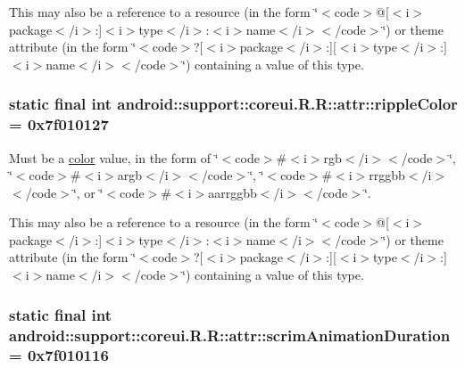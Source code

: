This may also be a reference to a resource (in the form \char`\"{}$<$code$>$@\mbox{[}$<$i$>$package$<$/i$>$:\mbox{]}$<$i$>$type$<$/i$>$:$<$i$>$name$<$/i$>$$<$/code$>$\char`\"{}) or theme attribute (in the form \char`\"{}$<$code$>$?\mbox{[}$<$i$>$package$<$/i$>$:\mbox{]}\mbox{[}$<$i$>$type$<$/i$>$:\mbox{]}$<$i$>$name$<$/i$>$$<$/code$>$\char`\"{}) containing a value of this type. \hypertarget{classandroid_1_1support_1_1coreui_1_1_r_1_1attr_b1eae2b1ba0e2289f70cf01928a468b0}{
\subsubsection[{rippleColor}]{\setlength{\rightskip}{0pt plus 5cm}static final int android::support::coreui.R.R::attr::rippleColor = 0x7f010127}}
\label{classandroid_1_1support_1_1coreui_1_1_r_1_1attr_b1eae2b1ba0e2289f70cf01928a468b0}


Must be a \hyperlink{classandroid_1_1support_1_1coreui_1_1_r_1_1color}{color} value, in the form of \char`\"{}$<$code$>$\#$<$i$>$rgb$<$/i$>$$<$/code$>$\char`\"{}, \char`\"{}$<$code$>$\#$<$i$>$argb$<$/i$>$$<$/code$>$\char`\"{}, \char`\"{}$<$code$>$\#$<$i$>$rrggbb$<$/i$>$$<$/code$>$\char`\"{}, or \char`\"{}$<$code$>$\#$<$i$>$aarrggbb$<$/i$>$$<$/code$>$\char`\"{}. 

This may also be a reference to a resource (in the form \char`\"{}$<$code$>$@\mbox{[}$<$i$>$package$<$/i$>$:\mbox{]}$<$i$>$type$<$/i$>$:$<$i$>$name$<$/i$>$$<$/code$>$\char`\"{}) or theme attribute (in the form \char`\"{}$<$code$>$?\mbox{[}$<$i$>$package$<$/i$>$:\mbox{]}\mbox{[}$<$i$>$type$<$/i$>$:\mbox{]}$<$i$>$name$<$/i$>$$<$/code$>$\char`\"{}) containing a value of this type. \hypertarget{classandroid_1_1support_1_1coreui_1_1_r_1_1attr_5b261d99174723c6d08db08327d1c894}{
\subsubsection[{scrimAnimationDuration}]{\setlength{\rightskip}{0pt plus 5cm}static final int android::support::coreui.R.R::attr::scrimAnimationDuration = 0x7f010116}}
\label{classandroid_1_1support_1_1coreui_1_1_r_1_1attr_5b261d99174723c6d08db08327d1c894}


